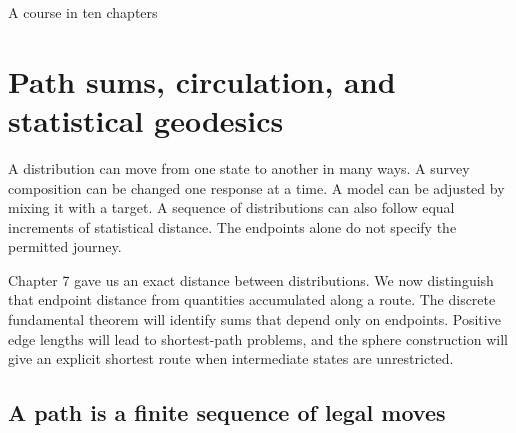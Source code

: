 \documentclass[11pt,oneside,openany]{book}
\theoremstyle{definition}
\theoremstyle{remark}
\numberwithin{equation}{chapter}
\begin{document}
\begin{titlepage}\color{ink}\centering\vspace*{1.0in}{\small\sffamily PROBABILITY AND MATHEMATICAL MODELLING\par}\vspace{.45in}{\Huge\bfseries Discrete Information\\[.12in]Geometry\par}\vspace{.35in}{\Large Finite Differences, Probability,\\and Information Flows\par}\vspace{1cm}{\Large Chapter 8\par}\vfill{}\vfill{\large A course in ten chapters\par}\end{titlepage}
\setcounter{chapter}{7}

\chapter{Path sums, circulation, and statistical geodesics}
A distribution can move from one state to another in many ways. A survey composition can be changed one response at a time. A model can be adjusted by mixing it with a target. A sequence of distributions can also follow equal increments of statistical distance. The endpoints alone do not specify the permitted journey.

Chapter 7 gave us an exact distance between distributions. We now distinguish that endpoint distance from quantities accumulated along a route. The discrete fundamental theorem will identify sums that depend only on endpoints. Positive edge lengths will lead to shortest-path problems, and the sphere construction will give an explicit shortest route when intermediate states are unrestricted.

\section{A path is a finite sequence of legal moves}\label{ch08-a-path-is-a-finite-sequence-of-legal-moves}
\end{document}
